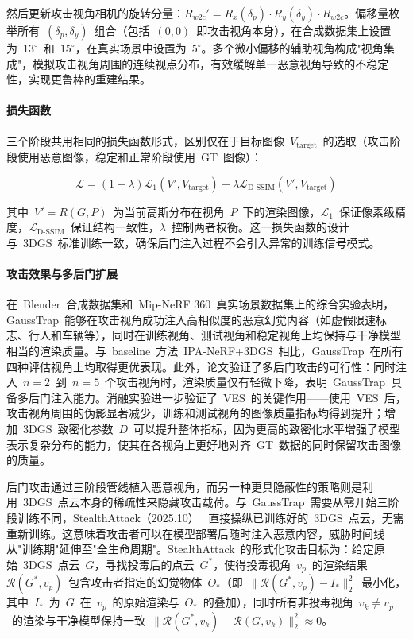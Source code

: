 然后更新攻击视角相机的旋转分量：$R_{w2c}' = R_x(\delta_p) \cdot R_y(\delta_y) \cdot R_{w2c}$。偏移量枚举所有~$(\delta_p, \delta_y)$~组合（包括~$(0,0)$~即攻击视角本身），在合成数据集上设置为~$13^\circ$~和~$15^\circ$，在真实场景中设置为~$5^\circ$。多个微小偏移的辅助视角构成"视角集成"，模拟攻击视角周围的连续视点分布，有效缓解单一恶意视角导致的不稳定性，实现更鲁棒的重建结果。

\paragraph{损失函数}

三个阶段共用相同的损失函数形式，区别仅在于目标图像~$V_{\text{target}}$~的选取（攻击阶段使用恶意图像，稳定和正常阶段使用~GT~图像）：

\begin{equation}
\mathcal{L} = (1 - \lambda) \mathcal{L}_1(V', V_{\text{target}}) + \lambda \mathcal{L}_{\text{D-SSIM}}(V', V_{\text{target}})
\end{equation}

其中~$V' = R(G, P)$~为当前高斯分布在视角~$P$~下的渲染图像，$\mathcal{L}_1$~保证像素级精度，$\mathcal{L}_{\text{D-SSIM}}$~保证结构一致性，$\lambda$~控制两者权衡。这一损失函数的设计与~3DGS~标准训练一致，确保后门注入过程不会引入异常的训练信号模式。

\paragraph{攻击效果与多后门扩展}

在~Blender~合成数据集和~Mip-NeRF 360~真实场景数据集上的综合实验表明，GaussTrap~能够在攻击视角成功注入高相似度的恶意幻觉内容（如虚假限速标志、行人和车辆等），同时在训练视角、测试视角和稳定视角上均保持与干净模型相当的渲染质量。与~baseline~方法~IPA-NeRF+3DGS~相比，GaussTrap~在所有四种评估视角上均取得更优表现。此外，论文验证了多后门攻击的可行性：同时注入~$n = 2$~到~$n = 5$~个攻击视角时，渲染质量仅有轻微下降，表明~GaussTrap~具备多后门注入能力。消融实验进一步验证了~VES~的关键作用——使用~VES~后，攻击视角周围的伪影显著减少，训练和测试视角的图像质量指标均得到提升；增加~3DGS~致密化参数~$D$~可以提升整体指标，因为更高的致密化水平增强了模型表示复杂分布的能力，使其在各视角上更好地对齐~GT~数据的同时保留攻击图像的质量。

后门攻击通过三阶段管线植入恶意视角，而另一种更具隐蔽性的策略则是利用~3DGS~点云本身的稀疏性来隐藏攻击载荷。与~GaussTrap~需要从零开始三阶段训练不同，StealthAttack（2025.10）~\cite{2510_02314} 直接操纵已训练好的~3DGS~点云，无需重新训练。这意味着攻击者可以在模型部署后随时注入恶意内容，威胁时间线从"训练期"延伸至"全生命周期"。StealthAttack~的形式化攻击目标为：给定原始~3DGS~点云~$G$，寻找投毒后的点云~$G^*$，使得投毒视角~$v_p$~的渲染结果~$\mathcal{R}(G^*, v_p)$~包含攻击者指定的幻觉物体~$O_*$（即~$\|\mathcal{R}(G^*, v_p) - I_*\|_2^2$~最小化，其中~$I_*$~为~$G$~在~$v_p$~的原始渲染与~$O_*$~的叠加），同时所有非投毒视角~$v_k \neq v_p$~的渲染与干净模型保持一致~$\|\mathcal{R}(G^*, v_k) - \mathcal{R}(G, v_k)\|_2^2 \approx 0$。

